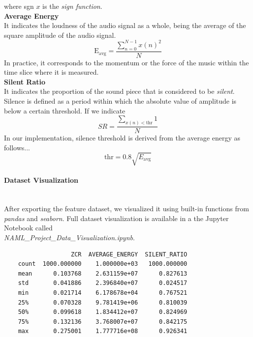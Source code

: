 \documentclass[12pt]{article}
\begin{document}
	where sgn $x$ is the \textit{sign function}.\\
	
	\textbf{Average Energy}\\
	It indicates the loudness of the audio signal as a whole, being the average of the square amplitude of the audio signal.
	\begin{equation}
		\text{E}_\text{avg}=\dfrac{\sum_{n=0}^{N-1}{x(n)^2}}{N}
	\end{equation}
	In practice, it corresponds to the momentum or the force of the music within the time slice where it is measured. \\
	
	\textbf{Silent Ratio}\\
	It indicates the proportion of the sound piece that is considered to be \textit{silent}. Silence is defined as a period within which the absolute value of amplitude is below a certain threshold. If we indicate
	\begin{equation}
		SR = \dfrac{\sum_{x(n)<\text{thr}} 1}{N}
	\end{equation}
	In our implementation, silence threshold is derived from the average energy as follows...
	\begin{equation}
		\text{thr}=0.8\sqrt{E_\text{avg}}
	\end{equation}
	\newpage
	
	\paragraph{Dataset Visualization}\mbox{}\\\newline
	After exporting the feature dataset, we visualized it using built-in functions from \textit{pandas} and \textit{seaborn}. Full dataset visualization is available in a the Jupyter Notebook called\\ \textit{NAML\_Project\_Data\_Visualization.ipynb}.
	
	\begin{lstlisting}
    		       ZCR  AVERAGE_ENERGY  SILENT_RATIO
	count  1000.000000    1.000000e+03   1000.000000
	mean      0.103768    2.631159e+07      0.827613
	std       0.041886    2.396840e+07      0.024517
	min       0.021714    6.178678e+04      0.767521 
	25%       0.070328    9.781419e+06      0.810039
	50%       0.099618    1.834412e+07      0.824969
	75%       0.132136    3.768007e+07      0.842175
	max       0.275001    1.777716e+08      0.926341
	\end{lstlisting}
	
\end{document}
